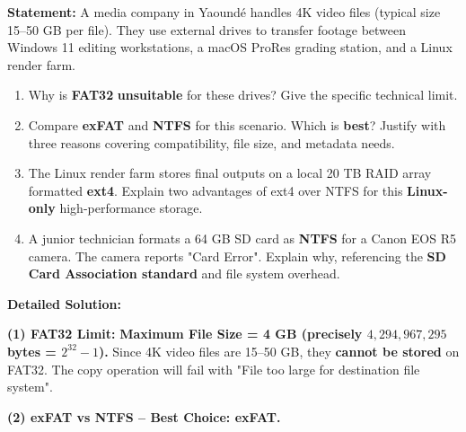\documentclass[11pt]{article}
\newcommand{\cle}[1]{{\popxbold\color{popdark}#1}}
\begin{document}
\begin{exoresolu}
\textbf{Statement:} A media company in Yaoundé handles 4K video files (typical size 15--50 GB per file). They use external drives to transfer footage between Windows 11 editing workstations, a macOS ProRes grading station, and a Linux render farm.
\begin{enumerate}
    \item Why is \textbf{FAT32} \textbf{unsuitable} for these drives? Give the specific technical limit.
    \item Compare \textbf{exFAT} and \textbf{NTFS} for this scenario. Which is \textbf{best}? Justify with three reasons covering compatibility, file size, and metadata needs.
    \item The Linux render farm stores final outputs on a local 20 TB RAID array formatted \textbf{ext4}. Explain two advantages of ext4 over NTFS for this \textbf{Linux-only} high-performance storage.
    \item A junior technician formats a 64 GB SD card as \textbf{NTFS} for a Canon EOS R5 camera. The camera reports "Card Error". Explain why, referencing the \textbf{SD Card Association standard} and file system overhead.
\end{enumerate}
\tcblower
\textbf{Detailed Solution:}

\noindent\textbf{(1) FAT32 Limit:}
\textbf{Maximum File Size = 4 GB (precisely $4,294,967,295$ bytes = $2^{32}-1$).}
Since 4K video files are 15--50 GB, they \textbf{cannot be stored} on FAT32. The copy operation will fail with "File too large for destination file system".

\noindent\textbf{(2) exFAT vs NTFS -- Best Choice: \cle{exFAT}.}


\end{exoresolu}
\end{document}
